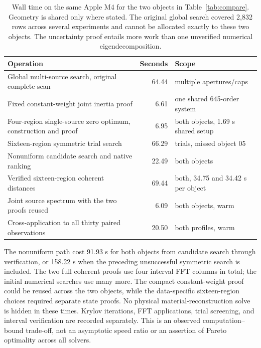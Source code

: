 \documentclass[anonymous,12pt]{iopjournal}
\theoremstyle{remark}\newtheorem{remark}[theorem]{Remark}
\numberwithin{equation}{section}
\begin{document}
\begin{table}[tb]
\caption{Wall time on the same Apple M4 for the two objects in Table~\ref{tab:compare}. Geometry is shared only where stated. The original global search covered 2,832 rows across several experiments and cannot be allocated exactly to these two objects. The uncertainty proof entails more work than one unverified numerical eigendecomposition.}\label{tab:cost}
\centering\begin{tabular}{@{}>{\raggedright\arraybackslash}p{.52\linewidth}r>{\raggedright\arraybackslash}p{.27\linewidth}@{}}\toprule
Operation & Seconds & Scope\\ \midrule
Global multi-source search, original complete scan &64.44& multiple apertures/caps\\
Fixed constant-weight joint inertia proof &6.61& one shared 645-order system\\
Four-region single-source zero optimum, construction and proof &6.95& both objects, 1.69 s shared setup\\
Sixteen-region symmetric trial search &66.29& 84 trials, missed object 05\\
Nonuniform candidate search and native ranking &22.49& both objects\\
Verified sixteen-region coherent distances &69.44& both, 34.75 and 34.42 s per object\\
Joint source spectrum with the two proofs reused &6.09& both objects, warm\\
Cross-application to all thirty paired observations &20.50& both profiles, warm\\ \bottomrule
\end{tabular}
\end{table}

The nonuniform path cost 91.93 s for both objects from candidate search through verification, or 158.22 s when the preceding unsuccessful symmetric search is included. The two full coherent proofs use four interval FFT columns in total; the initial numerical searches use many more. The compact constant-weight proof could be reused across the two objects, while the data-specific sixteen-region choices required separate state proofs. No physical material-reconstruction solve is hidden in these times. Krylov iterations, FFT applications, trial screening, and interval verification are recorded separately. This is an observed computation--bound trade-off, not an asymptotic speed ratio or an assertion of Pareto optimality across all solvers.
\end{document}
